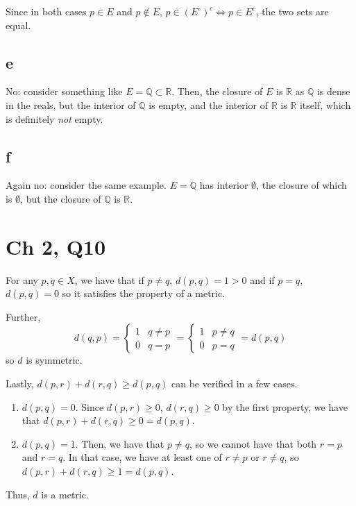 \documentclass[12pt,letterpaper]{article}
\theoremstyle{definition}
\newcommand{\R}{\mathbb{R}}
\newcommand{\Q}{\mathbb{Q}}
\begin{document}
Since in both cases $p \in E$ and $p \notin E$, $p \in (E^{\circ})^{c} \iff p \in \overline{E^{c}}$, the two sets are equal.

\subsection*{e}

No: consider something like $E = \Q \subset \R$. Then, the closure of $E$ is $\R$ as $\Q$ is dense in the reals, but the interior of $\Q$ is empty, and the interior of $\R$ is $\R$ itself, which is definitely \textit{not} empty.

\subsection*{f}

Again no: consider the same example. $E = \Q$ has interior $\emptyset$, the closure of which is $\emptyset$, but the closure of $\Q$ is $\R$.

\section*{Ch 2, Q10}

For any $p, q \in X$, we have that if $p \neq q$, $d(p,q) = 1 > 0$ and if $p = q$, $d(p,q) = 0$ so it satisfies the property of a metric.

Further,
\[
  d(q,p) = \begin{cases}
    1 & q \neq p \\
    0 & q = p
  \end{cases}
  = \begin{cases}
    1 & p \neq q \\
    0 & p = q
  \end{cases}
  = d(p,q)
\]
so $d$ is symmetric.

Lastly, $d(p,r) + d(r,q) \geq d(p,q)$ can be verified in a few cases.
\begin{enumerate}
  \item $d(p,q) = 0$. Since $d(p,r) \geq 0$, $d(r,q) \geq 0$ by the first property, we have that $d(p,r) + d(r,q) \geq 0 = d(p,q)$.
  \item $d(p,q) = 1$. Then, we have that $p \neq q$, so we cannot have that both $r = p$ and $r = q$. In that case, we have at least one of $r \neq p$ or $r \neq q$, so $d(p,r) + d(r,q) \geq 1 = d(p,q)$.
\end{enumerate}

Thus, $d$ is a metric.
\end{document}

